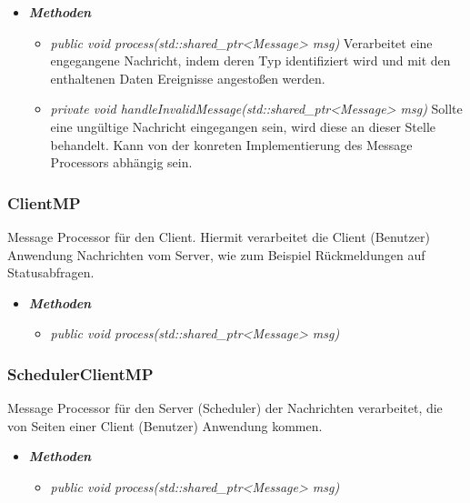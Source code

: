 \documentclass[a4paper,12pt]{article}
\begin{document}
	\begin{itemize}[label={}]

	\item\textit{\textbf{Methoden}}
		\begin{itemize}[label={\textbullet}]
			\item\textit{public void process(std::shared\_ptr<Message> msg)} Verarbeitet eine engegangene Nachricht, indem deren Typ identifiziert wird und mit den enthaltenen Daten Ereignisse angestoßen werden.
			\item\textit{private void handleInvalidMessage(std::shared\_ptr<Message> msg)} Sollte eine ungültige Nachricht eingegangen sein, wird diese an dieser Stelle behandelt. Kann von der konreten Implementierung des Message Processors abhängig sein.

		\end{itemize}

\end{itemize}


\subsubsection{ClientMP}

Message Processor für den Client. Hiermit verarbeitet die Client (Benutzer) Anwendung Nachrichten vom Server, wie zum Beispiel Rückmeldungen auf Statusabfragen.

	\begin{itemize}[label={}]

	\item\textit{\textbf{Methoden}}
		\begin{itemize}[label={\textbullet}]
			\item\textit{public void process(std::shared\_ptr<Message> msg)}

		\end{itemize}

\end{itemize}


\subsubsection{SchedulerClientMP}

Message Processor für den Server (Scheduler) der Nachrichten verarbeitet, die von Seiten einer Client (Benutzer) Anwendung kommen.

	\begin{itemize}[label={}]

	\item\textit{\textbf{Methoden}}
		\begin{itemize}[label={\textbullet}]
			\item\textit{public void process(std::shared\_ptr<Message> msg)}

		\end{itemize}

\end{itemize}
\end{document}
